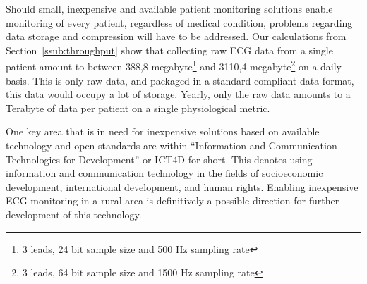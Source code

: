 Should small, inexpensive and available patient monitoring solutions enable monitoring of every patient, regardless of medical condition, problems regarding data storage and compression will have to be addressed. Our calculations from Section~\ref{ssub:throughput} show that collecting raw ECG data from a single patient amount to between 388,8 megabyte\footnote{3 leads, 24 bit sample size and 500 Hz sampling rate} and 3110,4 megabyte\footnote{3 leads, 64 bit sample size and 1500 Hz sampling rate} on a daily basis. This is only raw data, and packaged in a standard compliant data format, this data would occupy a lot of storage. Yearly, only the raw data amounts to a Terabyte of data per patient on a single physiological metric.

One key area that is in need for inexpensive solutions based on available technology and open standards are within ``Information and Communication Technologies for Development'' or ICT4D for short. This denotes using information and communication technology in the fields of socioeconomic development, international development, and human rights. Enabling inexpensive ECG monitoring in a rural area is definitively a possible direction for further development of this technology.


